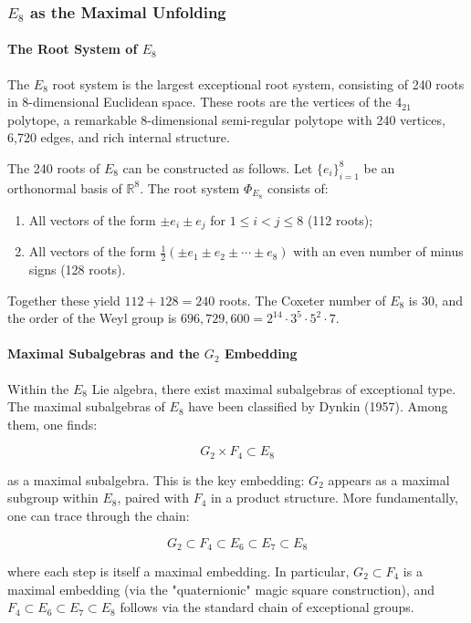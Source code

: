\documentclass[12pt,a4paper]{article}
\begin{document}
\subsubsection{$E_8$ as the Maximal Unfolding}

\paragraph{The Root System of $E_8$}

The $E_8$ root system is the largest exceptional root system, consisting of 240 roots in 8-dimensional Euclidean space. These roots are the vertices of the $4_{21}$ polytope, a remarkable 8-dimensional semi-regular polytope with 240 vertices, 6,720 edges, and rich internal structure.

The 240 roots of $E_8$ can be constructed as follows. Let $\{e_i\}_{i=1}^8$ be an orthonormal basis of $\mathbb{R}^8$. The root system $\Phi_{E_8}$ consists of:

\begin{enumerate}
    \item All vectors of the form $\pm e_i \pm e_j$ for $1 \leq i < j \leq 8$ (112 roots);
    \item All vectors of the form $\frac{1}{2}(\pm e_1 \pm e_2 \pm \cdots \pm e_8)$ with an even number of minus signs (128 roots).
\end{enumerate}

Together these yield $112 + 128 = 240$ roots. The Coxeter number of $E_8$ is 30, and the order of the Weyl group is $696{,}729{,}600 = 2^{14} \cdot 3^5 \cdot 5^2 \cdot 7$.

\paragraph{Maximal Subalgebras and the $G_2$ Embedding}

Within the $E_8$ Lie algebra, there exist maximal subalgebras of exceptional type. The maximal subalgebras of $E_8$ have been classified by Dynkin (1957). Among them, one finds:

\[G_2 \times F_4 \subset E_8\]

as a maximal subalgebra. This is the key embedding: $G_2$ appears as a maximal subgroup within $E_8$, paired with $F_4$ in a product structure. More fundamentally, one can trace through the chain:

\[G_2 \subset F_4 \subset E_6 \subset E_7 \subset E_8\]

where each step is itself a maximal embedding. In particular, $G_2 \subset F_4$ is a maximal embedding (via the "quaternionic" magic square construction), and $F_4 \subset E_6 \subset E_7 \subset E_8$ follows via the standard chain of exceptional groups.
\end{document}
